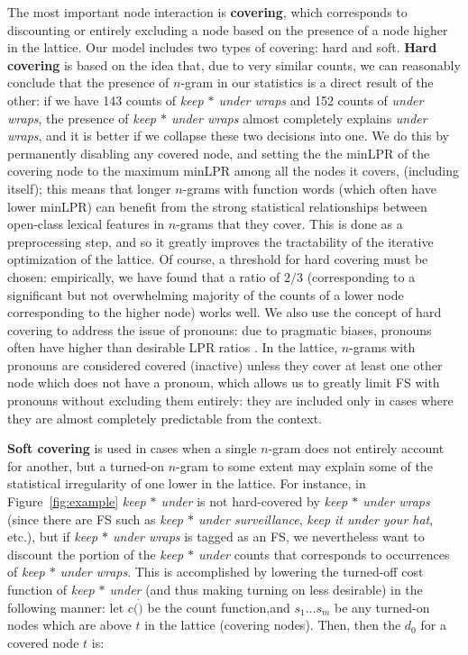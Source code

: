 \documentclass[11pt]{article}
\makeatletter
\def \etc {etc.\@ }
\newcommand{\dotts}{...}
\newcommand{\gap}{$*$\xspace}
\newcommand{\ex}[1]{\textit{#1}\xspace}
\newcommand{\termdef}[1]{\textbf{#1}\xspace}
\newcommand{\figref}[2][]{Figure#1~\ref{#2}\xspace}
\makeatother
\begin{document}
The most important node interaction is \termdef{covering}, which corresponds to discounting or entirely excluding a node based on the presence of a node higher in the lattice. Our model includes two types of covering: hard and soft. \termdef{Hard covering} is based on the idea that, due to very similar counts, we can reasonably conclude that the presence of $n$-gram in our statistics is a direct result of the other: if we have 143 counts of \ex{keep \gap under wraps} and 152 counts of \ex{under wraps}, the presence of \ex{keep \gap under wraps} almost completely explains \ex{under wraps}, and it is better if we collapse these two decisions into one. We do this by permanently disabling any covered node, and setting the the minLPR of the covering node to the maximum minLPR among all the nodes it covers, (including itself); this means that longer $n$-grams with function words (which often have lower minLPR) can benefit from the strong statistical relationships between open-class lexical features in $n$-grams that they cover. This is done as a preprocessing step, and so it greatly improves the tractability of the iterative optimization of the lattice. Of course, a threshold for hard covering must be chosen: empirically, we have found that a ratio of $2/3$ (corresponding to a significant but not overwhelming majority of the counts of a lower node corresponding to the higher node) works well.  We also use the concept of hard covering to address the issue of pronouns: due to pragmatic biases, pronouns often have higher than desirable LPR ratios \cite{Brooke15b}. In the lattice, $n$-grams with pronouns are considered covered (inactive) unless they cover at least one other node which does not have a pronoun, which allows us to greatly limit FS with pronouns without excluding them entirely: they are included only in cases where they are almost completely predictable from the context. 


\termdef{Soft covering} is used in cases when a single $n$-gram does not entirely account for another, but a turned-on $n$-gram to some extent may explain some of the statistical irregularity of one lower in the lattice. For instance, in \figref{fig:example} \ex{keep \gap under} is not hard-covered by \ex{keep \gap under wraps} (since there are FS such as \ex{keep \gap under surveillance}, \ex{keep it under your hat}, \etc), but if \ex{keep \gap under wraps} is tagged as an FS, we nevertheless want to discount the portion of the \ex{keep \gap under} counts that corresponds to occurrences of \ex{keep \gap under wraps}. This is accomplished by lowering the turned-off cost function of \ex{keep \gap under} (and thus making turning on less desirable) in the following manner: let $c(\dot)$ be the count function,and $s_1\dotts s_m$ be any turned-on nodes which are above $t$ in the lattice (covering nodes). Then, then the $d_0$ for a covered node $t$ is:
\end{document}
